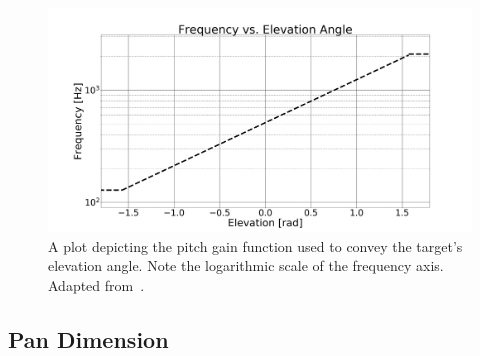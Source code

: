 \documentclass[acmsmall]{acmart}
\begin{document}

\begin{figure}
  \centering
  \includegraphics[clip, trim=0 0 0 40, width=0.7\columnwidth]{figures/pitch_gain_function.png}
  \caption{A plot depicting the pitch gain function used to convey the target's elevation angle. Note the logarithmic scale of the frequency axis. Adapted from~\citet{lock2019bone}. }\label{fig:pitch-gain}
\end{figure}

\subsection{Pan Dimension}
\end{document}

